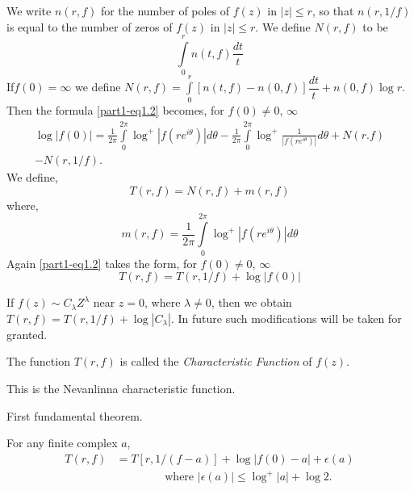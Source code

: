 We write $n(r,f)$ for the number of poles of $f(z)$ in $|z|\leq r$, so
that $n(r,1/f)$ is equal to the number of zeros of $f(z)$ in $|z|\leq
r$. We define $N(r,f)$ to be
\begin{equation*}
\int\limits^{r}_{0}n(t,f)\frac{dt}{t}\tag{3}\label{part1-eq3}
\end{equation*}
If\pageoriginale $f(0)=\infty$ we define
$N(r,f)=\int\limits^{r}_{0}[n(t,f)-n(0,f)]\dfrac{dt}{t}+n(0,f)\log r$. Then
the formula \eqref{part1-eq1.2} becomes, for $f(0)\neq 0$, $\infty$
\begin{gather*}
\log
|f(0)|=\frac{1}{2\pi}\int\limits^{2\pi}_{0}\log^{+}|f(re^{i\theta})|d\theta-\frac{1}{2\pi}\int\limits^{2\pi}_{0}\log^{+}\frac{1}{|f(re^{i\theta})|}d\theta+N(r.f)\\
-N(r,1/f).
\end{gather*}
We define,
\begin{equation*}
T(r,f)=N(r,f)+m(r,f)\tag{1.4}\label{part1-eq1.4}
\end{equation*}
where,
\begin{equation*}
m(r,f)=\frac{1}{2\pi}\int\limits^{2\pi}_{0}
\log^{+}|f(re^{i\theta})|d\theta\tag{1.5}\label{part1-eq1.5} 
\end{equation*}
Again \eqref{part1-eq1.2} takes the form, for $f(0)\neq 0$, $\infty$
\begin{equation*}
T(r,f)=T(r,1/f)+\log |f(0)|\tag{$1.2'$}\label{part1-eq1.2'}
\end{equation*}

If $f(z)\sim C_{\lambda}Z^{\lambda}$ near $z=0$, where $\lambda\neq
0$, then we obtain\break $T(r,f)=T(r,1/f)+\log|C_{\lambda}|$. In future such
modifications will be taken for granted.

The function $T(r,f)$ is called the {\em Characteristic Function} of
$f(z)$.

This is the Nevanlinna characteristic function.

\begin{thm}\label{thm2}
First fundamental theorem.
\end{thm}

For any finite complex $a$,
\begin{align*}
T(r,f)&=T[r,1/(f-a)]+\log |f(0)-a|+\epsilon(a)\\
&\qquad\qquad\text{ \ where \ }|\epsilon(a)|\leq \log^{+}|a|+\log 2.
\end{align*}

